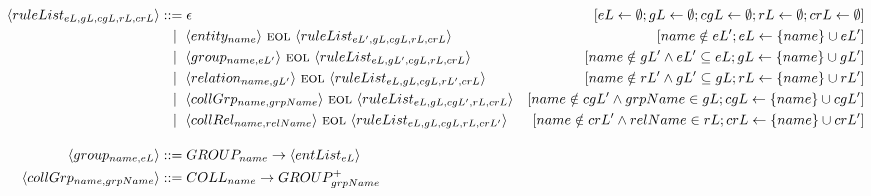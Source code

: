 \begin{frame}{}
\begin{adjustbox}{max width=\linewidth,max height=.95\textheight,valign=c}
{\begin{align*}
                \langle ruleList_{eL,gL,cgL,rL,crL} \rangle & ::= \epsilon                                                                                                 & [eL \gets \emptyset; gL \gets \emptyset; cgL \gets \emptyset; rL \gets \emptyset; crL \gets \emptyset] \\
                                                            & ~~ \mid ~ \langle entity_{name}          \rangle ~\textsc{eol}~ \langle ruleList_{eL',gL,cgL,rL,crL} \rangle & [name \notin eL'; eL \gets \{name\} \cup eL']                                                          \\
                                                            & ~~ \mid ~ \langle group_{name, eL'}      \rangle ~\textsc{eol}~ \langle ruleList_{eL,gL',cgL,rL,crL} \rangle & [name \notin gL' \land eL' \subseteq eL; gL \gets \{name\} \cup gL']                                   \\
                                                            & ~~ \mid ~ \langle relation_{name, gL'}   \rangle ~\textsc{eol}~ \langle ruleList_{eL,gL,cgL,rL',crL} \rangle & [name \notin rL' \land gL' \subseteq gL; rL \gets \{name\} \cup rL']                                   \\
                                                            & ~~ \mid ~ \langle collGrp_{name,grpName} \rangle ~\textsc{eol}~ \langle ruleList_{eL,gL,cgL',rL,crL} \rangle & [name \notin cgL' \land grpName \in gL; cgL \gets \{name\} \cup cgL']                                  \\
                                                            & ~~ \mid ~ \langle collRel_{name,relName} \rangle ~\textsc{eol}~ \langle ruleList_{eL,gL,cgL,rL,crL'} \rangle & [name \notin crL' \land relName \in rL; crL \gets \{name\} \cup crL']                                  \\[1em]
                \langle group_{name, eL} \rangle            & ::= GROUP_{name} \to \langle entList_{eL} \rangle                                                                                                                                                                     \\
                \langle collGrp_{name,grpName} \rangle      & ::= COLL_{name} \to GROUP_{grpName}^+                                                                                                                                                                                 \\[1em]

\end{align*}}
\end{adjustbox}
\end{frame}
